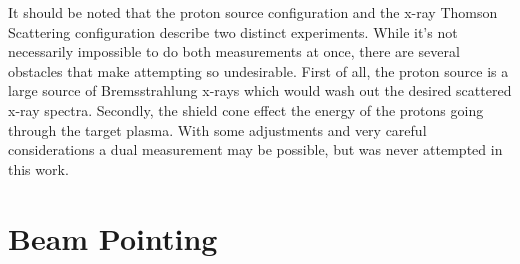 It should be noted that the proton source configuration and the x-ray Thomson Scattering configuration describe two distinct experiments. While it's not necessarily impossible to do both measurements at once, there are several obstacles that make attempting so undesirable. First of all, the proton source is a large source of Bremsstrahlung x-rays which would wash out the desired scattered x-ray spectra. Secondly, the shield cone effect the energy of the protons going through the target plasma. With some adjustments and very careful considerations a dual measurement may be possible, but was never attempted in this work.


\section{Beam Pointing}

